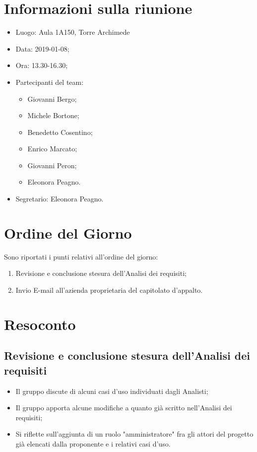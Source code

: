 \documentclass[11pt,a4paper]{article}
\begin{document}
	\section{Informazioni sulla riunione}
	\begin{itemize}
		\item Luogo: Aula 1A150, Torre Archimede
		\item Data: 2019-01-08;
		\item Ora: 13.30-16.30;
		\item Partecipanti del team:
			\begin{itemize}
				\item Giovanni Bergo;
				\item Michele Bortone;
				\item Benedetto Cosentino;
				\item Enrico Marcato;
				\item Giovanni Peron;
				\item Eleonora Peagno.
			\end{itemize}
		\item Segretario: Eleonora Peagno.
	\end{itemize}
	
	\section{Ordine del Giorno}
	Sono riportati i punti relativi all'ordine del giorno:
	\begin{enumerate}
		\item Revisione e conclusione stesura dell'Analisi dei requisiti;
		\item Invio E-mail all'azienda proprietaria del capitolato d'appalto.
	\end{enumerate}
	
	\section{Resoconto}
	\subsection{Revisione e conclusione stesura dell'Analisi dei requisiti}
	\begin{itemize}
		\item Il gruppo discute di alcuni casi d'uso individuati dagli Analisti;
		\item Il gruppo apporta alcune modifiche a quanto già scritto nell'Analisi dei requisiti;
		\item Si riflette sull'aggiunta di un ruolo "amministratore" fra gli attori del progetto già elencati dalla proponente e i relativi casi d'uso.
	\end{itemize}
\end{document}
